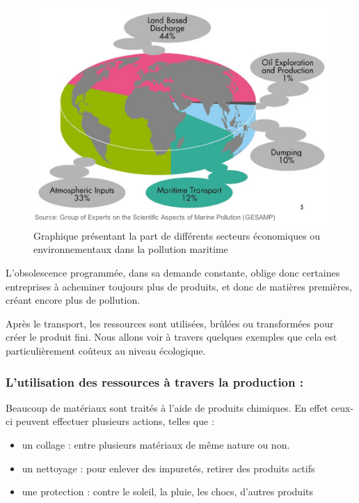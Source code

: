 \begin{figure}[h]
\centerline{\includegraphics[scale=0.75]{Rsc/pollution_maritime.png}}
\caption{Graphique présentant la part de différents secteurs économiques ou environnementaux dans la pollution maritime}
\label{PollutionMaritime}%
\end{figure}

L'obsolescence programmée, dans sa demande constante, oblige donc certaines entreprises à acheminer toujours plus de produits, et donc de matières premières, créant encore plus de pollution.

\bigbreak Après le transport, les ressources sont utilisées, brûlées ou transformées pour créer le produit fini. Nous allons voir à travers quelques exemples que cela est particulièrement coûteux au niveau écologique.


\subsubsection{L'utilisation des ressources à travers la production : }

Beaucoup de matériaux sont traités à l'aide de produits chimiques. En effet ceux-ci peuvent effectuer plusieurs actions, telles que : 
\begin{itemize}
  \item un collage : entre plusieurs matériaux de même nature ou non. 
  \item un nettoyage : pour enlever des impuretés, retirer des produits actifs
  \item une protection : contre le soleil, la pluie, les chocs, d'autres produits
\end{itemize}

